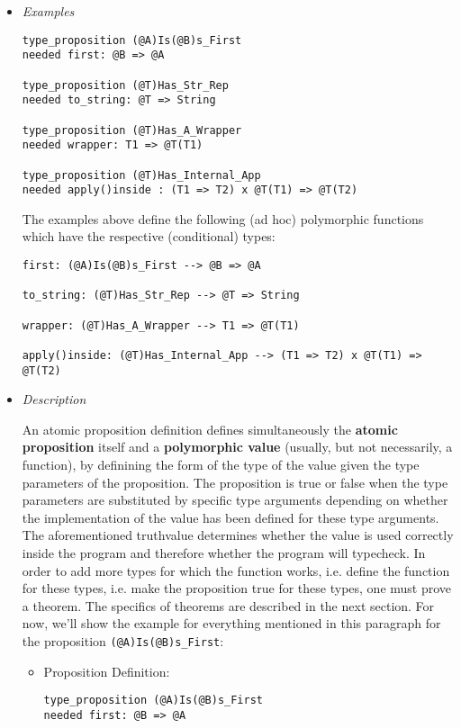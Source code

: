 \documentclass{article}
\begin{document}
\begin{itemize}
\item \textit{Examples}
\begin{verbatim}
type_proposition (@A)Is(@B)s_First
needed first: @B => @A

type_proposition (@T)Has_Str_Rep
needed to_string: @T => String

type_proposition (@T)Has_A_Wrapper
needed wrapper: T1 => @T(T1)

type_proposition (@T)Has_Internal_App
needed apply()inside : (T1 => T2) x @T(T1) => @T(T2)
\end{verbatim}
The examples above define the following (ad hoc) polymorphic functions which
have the respective (conditional) types:
\begin{verbatim}
first: (@A)Is(@B)s_First --> @B => @A

to_string: (@T)Has_Str_Rep --> @T => String

wrapper: (@T)Has_A_Wrapper --> T1 => @T(T1)

apply()inside: (@T)Has_Internal_App --> (T1 => T2) x @T(T1) => @T(T2)
\end{verbatim}

\item \textit{Description}

An atomic proposition definition defines simultaneously the \textbf{atomic
proposition} itself and a \textbf{polymorphic value} (usually, but not
necessarily, a function), by definining the form of the type of the value given
the type parameters of the proposition. The proposition is true or false when
the type parameters are substituted by specific type arguments depending on
whether the implementation of the value has been defined for these type
arguments. The aforementioned truthvalue determines whether the value is used
correctly inside the program and therefore whether the program will typecheck.
In order to add more types for which the function works, i.e.  define the
function for these types, i.e. make the proposition true for these types, one
must prove a theorem. The specifics of theorems are described in the next
section. For now, we'll show the example for everything mentioned in this
paragraph for the proposition \texttt{(@A)Is(@B)s_First}:

\begin{itemize}
\item Proposition Definition:

\begin{verbatim}
type_proposition (@A)Is(@B)s_First
needed first: @B => @A
\end{verbatim}


\end{itemize}
\end{itemize}
\end{document}

